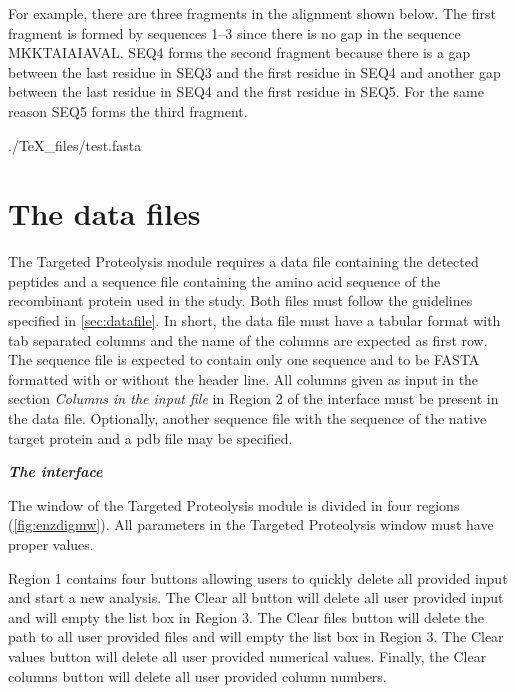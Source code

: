 For example, there are three fragments in the alignment shown below. The first fragment is formed by sequences \numrange{1}{3} since there is no gap in the sequence MKKTAIAIAVAL. SEQ\num{4} forms the second fragment because there is a gap between the last residue in SEQ\num{3} and the first residue in SEQ\num{4} and another gap between the last residue in SEQ\num{4} and the first residue in SEQ\num{5}. For the same reason SEQ\num{5} forms the third fragment.

\begin{texshade}{./TeX_files/test.fasta}
	\hideconsensus
\end{texshade}

\section{The data files}

The Targeted Proteolysis module requires a data file containing the detected peptides and a sequence file containing the amino acid sequence of the recombinant protein used in the study. Both files must follow the guidelines specified in \autoref{sec:datafile}. In short, the data file must have a tabular format with tab separated columns and the name of the columns are expected as first row. The sequence file is expected to contain only one sequence and to be FASTA formatted with or without the header line. All columns given as input in the section \textit{Columns in the input file} in Region \num{2} of the interface must be present in the data file. Optionally, another sequence file with the sequence of the native target protein and a pdb file may be specified.

\textit{\textbf{The interface}}

The window of the Targeted Proteolysis module is divided in four regions (\autoref{fig:enzdigmw}). All parameters in the Targeted Proteolysis window must have proper values. 

Region \num{1} contains four buttons allowing users to quickly delete all provided input and start a new analysis. The Clear all button will delete all user provided input and will empty the list box in Region \num{3}. The Clear files button will delete the path to all user provided files and will empty the list box in Region \num{3}. The Clear values button will delete all user provided numerical values. Finally, the Clear columns button will delete all user provided column numbers. 

